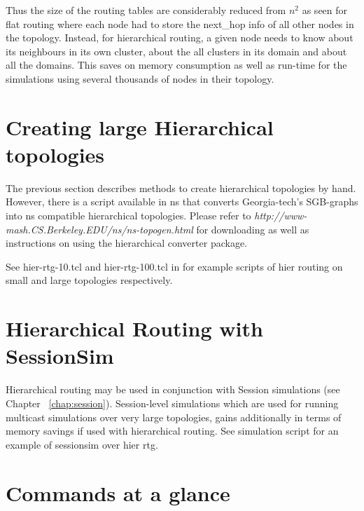 Thus the size of the routing tables are considerably reduced from 
$n^{2}$ as seen for flat routing where each node had to store the
  next\_hop info of all other nodes in the topology. Instead, for
  hierarchical routing, a given node needs to know about its neighbours
  in its own cluster, about the all clusters in its domain and about all
  the domains. This saves on memory consumption as well as run-time for
  the simulations using several thousands of nodes in their topology.


\section{Creating large Hierarchical topologies}
\label{large-hier-topo}
The previous section describes methods to create hierarchical topologies
by hand. However, there is a script available in ns that converts
Georgia-tech's SGB-graphs into ns compatible hierarchical topologies.
Please refer to {\em http://www-mash.CS.Berkeley.EDU/ns/ns-topogen.html}
for downloading as well as instructions on using the hierarchical
converter package. 

See hier-rtg-10.tcl and hier-rtg-100.tcl in  for example
scripts of hier routing on small and large topologies
respectively. 


\section{Hierarchical Routing with SessionSim}
\label{sec:hier-rtg-with-sessionsim}

Hierarchical routing may be used in conjunction with Session simulations
(see Chapter ~\ref{chap:session}). Session-level simulations which are used
for running multicast simulations over very large topologies, gains
additionally in terms of memory savings if used with hierarchical
routing. See simulation script 
for an example of sessionsim over hier rtg.


\section{Commands at a glance}
\label{sec:dynamicscommand}

